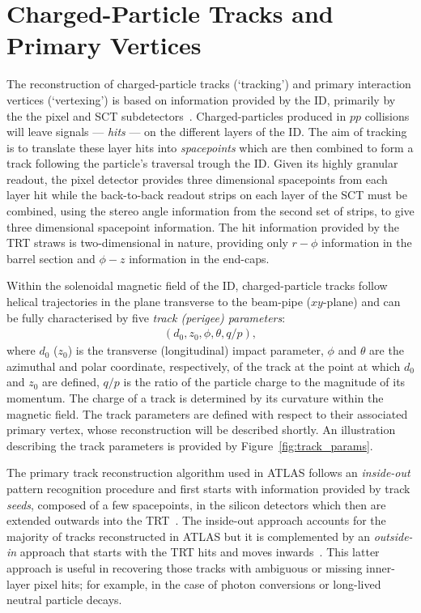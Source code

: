 \section{Charged-Particle Tracks and Primary Vertices}
\label{sec:tracks_and_vertices}

The reconstruction of charged-particle tracks (`tracking') and primary interaction
vertices (`vertexing') is based on information provided by the ID, primarily by the
the pixel and SCT subdetectors~\cite{NEWTracking,TIDE,Aaboud:2016rmg,ATLAS-CONF-2010-069,Piacquadio_2008}.
Charged-particles produced in $pp$ collisions will leave signals --- \textit{hits} ---
on the different layers of the ID.
The aim of tracking is to translate these layer hits into \textit{spacepoints}
which are then combined to form a track following the particle's traversal trough the ID.
Given its highly granular readout, the pixel detector provides three dimensional spacepoints
from each layer hit while the back-to-back readout strips on each layer of the SCT 
must be combined, using the stereo angle information from the second set of strips, to
give three dimensional spacepoint information.
The hit information provided by the TRT straws is two-dimensional in nature, providing only
$r-\phi$ information in the barrel section and $\phi-z$ information in the end-caps.

Within the solenoidal magnetic field of the ID, charged-particle tracks follow
helical trajectories in the plane transverse to the beam-pipe ($xy$-plane) and
can be fully characterised by five \textit{track (perigee) parameters}:
\begin{align}
    \left(d_0, z_0, \phi, \theta, q/p\right),
    \label{eq:track_parameters}
\end{align}
where $d_0$ ($z_0$) is the transverse (longitudinal) impact parameter,
$\phi$ and $\theta$ are the azimuthal and polar coordinate, respectively, of the track at the
point at which $d_0$ and $z_0$ are defined, $q/p$ is the ratio of the particle charge
to the magnitude of its momentum.
The charge of a track is determined by its curvature within the magnetic field.
The track parameters are defined with respect to their associated primary
vertex, whose reconstruction will be described shortly.
An illustration describing the track parameters is provided by Figure~\ref{fig:track_params}.

The primary track reconstruction algorithm used in ATLAS follows an \textit{inside-out} pattern
recognition procedure and first starts with information
provided by track \textit{seeds}, composed of a few spacepoints, in the silicon detectors
which then are extended outwards into the TRT~\cite{NEWTracking}.
The inside-out approach accounts for the majority of tracks reconstructed in ATLAS but
it is complemented by an \textit{outside-in} approach that starts with the TRT hits and moves
inwards~\cite{NEWTracking}.
This latter approach is useful in recovering those tracks with ambiguous or missing inner-layer pixel hits;
for example, in the case of photon
conversions or long-lived neutral particle decays.

